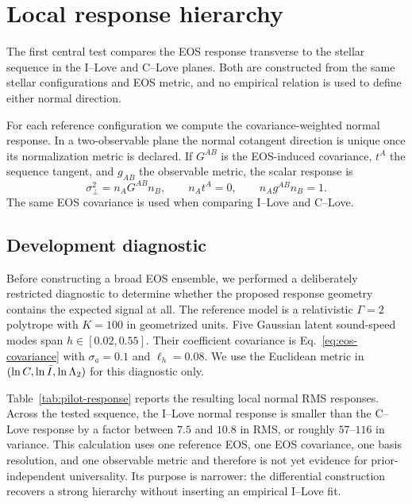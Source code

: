 \section{Local response hierarchy}
\label{sec:localresults}

The first central test compares the EOS response transverse to the stellar sequence in the I--Love and C--Love planes. Both are constructed from the same stellar configurations and EOS metric, and no empirical relation is used to define either normal direction.

For each reference configuration we compute the covariance-weighted normal response. In a two-observable plane the normal cotangent direction is unique once its normalization metric is declared. If \(G^{AB}\) is the EOS-induced covariance, \(t^A\) the sequence tangent, and \(g_{AB}\) the observable metric, the scalar response is
\begin{equation}
    \sigma_\perp^2
    =
    n_A G^{AB}n_B,
    \qquad
    n_A t^A=0,
    \qquad
    n_A g^{AB}n_B=1.
    \label{eq:normal-rms}
\end{equation}
The same EOS covariance is used when comparing I--Love and C--Love.

\subsection{Development diagnostic}

Before constructing a broad EOS ensemble, we performed a deliberately restricted diagnostic to determine whether the proposed response geometry contains the expected signal at all. The reference model is a relativistic \(\Gamma=2\) polytrope with \(K=100\) in geometrized units. Five Gaussian latent sound-speed modes span \(h\in[0.02,0.55]\). Their coefficient covariance is Eq.~\eqref{eq:eos-covariance} with \(\sigma_a=0.1\) and \(\ell_h=0.08\). We use the Euclidean metric in \((\ln C,\ln\bar I,\ln\Lambda_2)\) for this diagnostic only.

Table~\ref{tab:pilot-response} reports the resulting local normal RMS responses. Across the tested sequence, the I--Love normal response is smaller than the C--Love response by a factor between \(7.5\) and \(10.8\) in RMS, or roughly \(57\)--\(116\) in variance. This calculation uses one reference EOS, one EOS covariance, one basis resolution, and one observable metric and therefore is not yet evidence for prior-independent universality. Its purpose is narrower: the differential construction recovers a strong hierarchy without inserting an empirical I--Love fit.

